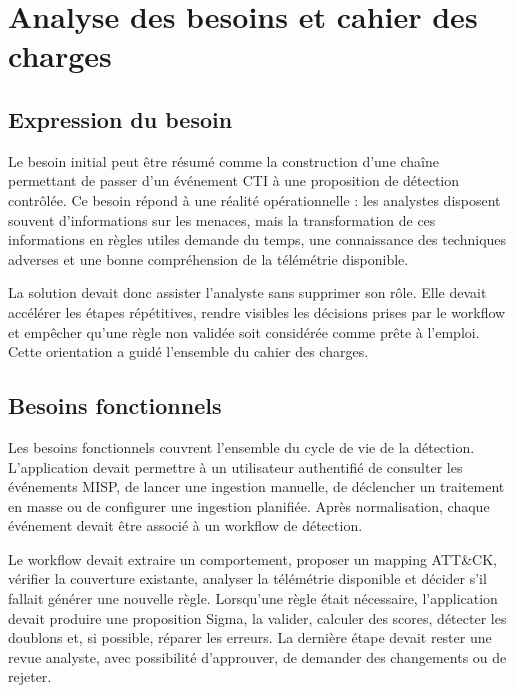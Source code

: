 \chapter{Analyse des besoins et cahier des charges}

\section{Expression du besoin}

Le besoin initial peut être résumé comme la construction d'une chaîne permettant de passer d'un événement CTI à une proposition de détection contrôlée. Ce besoin répond à une réalité opérationnelle : les analystes disposent souvent d'informations sur les menaces, mais la transformation de ces informations en règles utiles demande du temps, une connaissance des techniques adverses et une bonne compréhension de la télémétrie disponible.

La solution devait donc assister l'analyste sans supprimer son rôle. Elle devait accélérer les étapes répétitives, rendre visibles les décisions prises par le workflow et empêcher qu'une règle non validée soit considérée comme prête à l'emploi. Cette orientation a guidé l'ensemble du cahier des charges.

\section{Besoins fonctionnels}

Les besoins fonctionnels couvrent l'ensemble du cycle de vie de la détection. L'application devait permettre à un utilisateur authentifié de consulter les événements MISP, de lancer une ingestion manuelle, de déclencher un traitement en masse ou de configurer une ingestion planifiée. Après normalisation, chaque événement devait être associé à un workflow de détection.

Le workflow devait extraire un comportement, proposer un mapping ATT\&CK, vérifier la couverture existante, analyser la télémétrie disponible et décider s'il fallait générer une nouvelle règle. Lorsqu'une règle était nécessaire, l'application devait produire une proposition Sigma, la valider, calculer des scores, détecter les doublons et, si possible, réparer les erreurs. La dernière étape devait rester une revue analyste, avec possibilité d'approuver, de demander des changements ou de rejeter.

